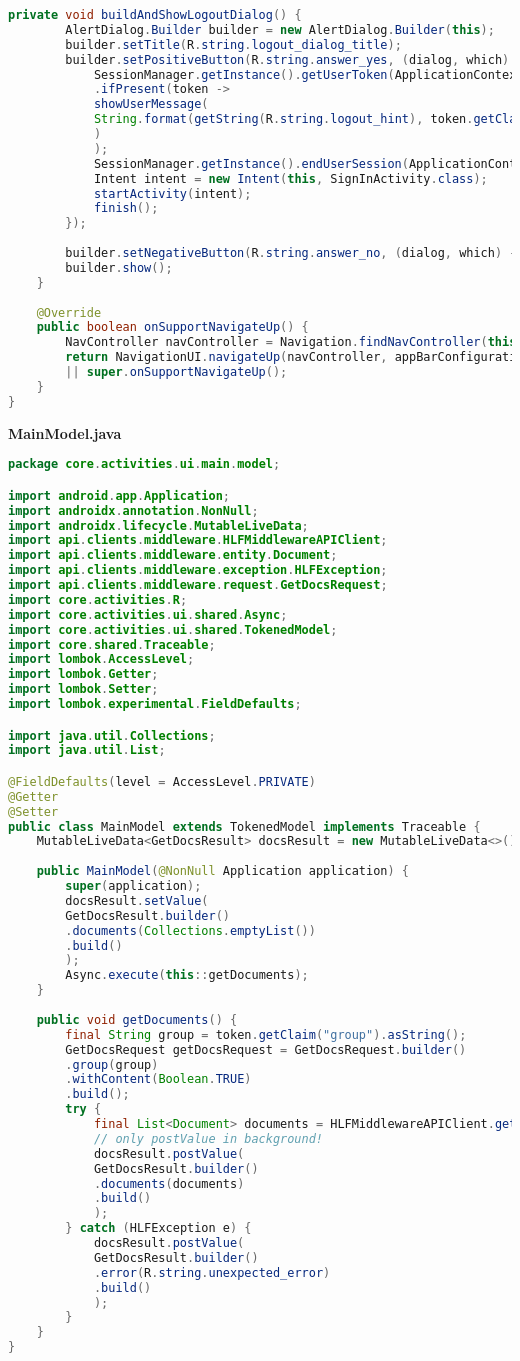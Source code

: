\begin{lstlisting}[language=Java]
	private void buildAndShowLogoutDialog() {
		AlertDialog.Builder builder = new AlertDialog.Builder(this);
		builder.setTitle(R.string.logout_dialog_title);
		builder.setPositiveButton(R.string.answer_yes, (dialog, which) -> {
			SessionManager.getInstance().getUserToken(ApplicationContext.get())
			.ifPresent(token ->
			showUserMessage(
			String.format(getString(R.string.logout_hint), token.getClaim("member").asString())
			)
			);
			SessionManager.getInstance().endUserSession(ApplicationContext.get());
			Intent intent = new Intent(this, SignInActivity.class);
			startActivity(intent);
			finish();
		});
		
		builder.setNegativeButton(R.string.answer_no, (dialog, which) -> dialog.cancel());
		builder.show();
	}
	
	@Override
	public boolean onSupportNavigateUp() {
		NavController navController = Navigation.findNavController(this, R.id.navHostFragment);
		return NavigationUI.navigateUp(navController, appBarConfiguration)
		|| super.onSupportNavigateUp();
	}
}
\end{lstlisting}
\textbf{MainModel.java}
\begin{lstlisting}[language=Java]
package core.activities.ui.main.model;

import android.app.Application;
import androidx.annotation.NonNull;
import androidx.lifecycle.MutableLiveData;
import api.clients.middleware.HLFMiddlewareAPIClient;
import api.clients.middleware.entity.Document;
import api.clients.middleware.exception.HLFException;
import api.clients.middleware.request.GetDocsRequest;
import core.activities.R;
import core.activities.ui.shared.Async;
import core.activities.ui.shared.TokenedModel;
import core.shared.Traceable;
import lombok.AccessLevel;
import lombok.Getter;
import lombok.Setter;
import lombok.experimental.FieldDefaults;

import java.util.Collections;
import java.util.List;

@FieldDefaults(level = AccessLevel.PRIVATE)
@Getter
@Setter
public class MainModel extends TokenedModel implements Traceable {
	MutableLiveData<GetDocsResult> docsResult = new MutableLiveData<>();
	
	public MainModel(@NonNull Application application) {
		super(application);
		docsResult.setValue(
		GetDocsResult.builder()
		.documents(Collections.emptyList())
		.build()
		);
		Async.execute(this::getDocuments);
	}
	
	public void getDocuments() {
		final String group = token.getClaim("group").asString();
		GetDocsRequest getDocsRequest = GetDocsRequest.builder()
		.group(group)
		.withContent(Boolean.TRUE)
		.build();
		try {
			final List<Document> documents = HLFMiddlewareAPIClient.getInstance().getDocs(getDocsRequest, token.toString()).getDocuments();
			// only postValue in background!
			docsResult.postValue(
			GetDocsResult.builder()
			.documents(documents)
			.build()
			);
		} catch (HLFException e) {
			docsResult.postValue(
			GetDocsResult.builder()
			.error(R.string.unexpected_error)
			.build()
			);
		}
	}
}
\end{lstlisting}

